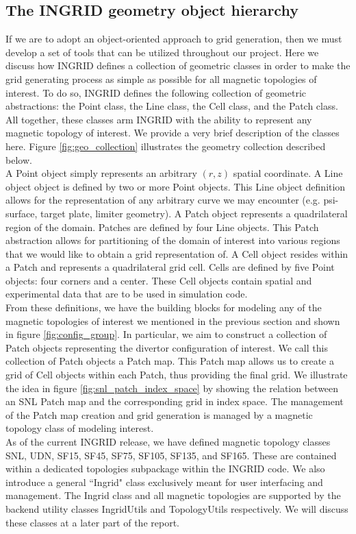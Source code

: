 \subsection{\label{sec:label2}The INGRID geometry object hierarchy}
If we are to adopt an object-oriented approach to grid generation, then we must develop a set of tools that can be utilized throughout our project. Here we discuss how INGRID defines a collection of geometric classes in order to make the grid generating process as simple as possible for all magnetic topologies of interest. To do so, INGRID defines the following collection of geometric abstractions: the Point class, the Line class, the Cell class, and the Patch class. All together, these classes arm INGRID with the ability to represent any magnetic topology of interest. We provide a very brief description of the classes here. Figure \ref{fig:geo_collection} illustrates the geometry collection described below.\\
\indent
A Point object simply represents an arbitrary $(r,z)$ spatial coordinate. A Line object object is defined by two or more Point objects. This Line object definition allows for the representation of any arbitrary curve we may encounter (e.g. psi-surface, target plate, limiter geometry). A Patch object represents a quadrilateral region of the domain. Patches are defined by four Line objects. This Patch abstraction allows for partitioning of the domain of interest into various regions that we would like to obtain a grid representation of. A Cell object resides within a Patch and represents a quadrilateral grid cell. Cells are defined by five Point objects: four corners and a center. These Cell objects contain spatial and experimental data that are to be used in simulation code.\\ \indent
From these definitions, we have the building blocks for modeling any of the magnetic topologies of interest we mentioned in the previous section and shown in figure \ref{fig:config_group}. In particular, we aim to construct a collection of Patch objects representing the divertor configuration of interest. We call this collection of Patch objects a Patch map. This Patch map allows us to create a grid of Cell objects within each Patch, thus providing the final grid. We illustrate the idea in figure \ref{fig:snl_patch_index_space} by showing the relation between an SNL Patch map and the corresponding grid in index space. The management of the Patch map creation and grid generation is managed by a magnetic topology class of modeling interest. \\ \indent
As of the current INGRID release, we have defined magnetic topology classes SNL, UDN, SF15, SF45, SF75, SF105, SF135, and SF165. These are contained within a dedicated topologies subpackage within the INGRID code. We also introduce a general ``Ingrid" class exclusively meant for user interfacing and management. The Ingrid class and all magnetic topologies are supported by the backend utility classes IngridUtils and TopologyUtils respectively. We will discuss these classes at a later part of the report.
